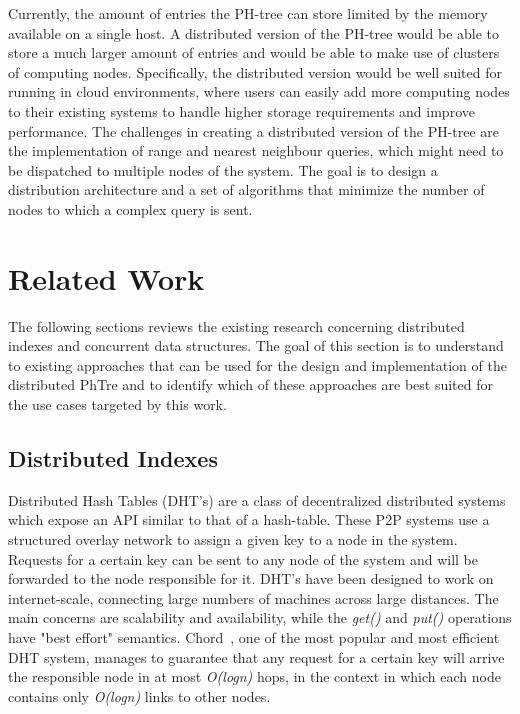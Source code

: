 \documentclass[11pt,a4paper]{globis-book}
\begin{document}
Currently, the amount of entries the PH-tree can store limited by the memory available on a single host. A distributed version of the PH-tree would be able to store a much larger amount of entries and would be able to make use of clusters of computing nodes. Specifically, the distributed version would be well suited for running in cloud environments, where users can easily add more computing nodes to their existing systems to handle higher storage requirements and improve performance. The challenges in creating a distributed version of the PH-tree are the implementation of range and nearest neighbour queries, which might need to be dispatched to multiple nodes of the system. The goal is to design a distribution architecture and a set of algorithms that minimize the number of nodes to which a complex query is sent.

\section{Related Work}
\label{sec:background-rw}

The following sections reviews the existing research concerning distributed indexes and concurrent data structures. The goal of this section is to understand to existing approaches that can be used for the design and implementation of the distributed PhTre and to identify which of these approaches are best suited for the use cases targeted by this work.
\subsection{Distributed Indexes}

Distributed Hash Tables (DHT's) are a class of decentralized distributed systems which expose an API similar to that of a hash-table. These P2P systems use a structured overlay network to assign a given key to a node in the system. Requests for a certain key can be sent to any node of the system and will be forwarded to the node responsible for it. DHT's have been designed to work on internet-scale, connecting large numbers of machines across large distances. The main concerns are scalability and availability, while the \textit{get()} and \textit{put()} operations have "best effort" semantics. Chord~\cite{Stoica2001chord}, one of the most popular and most efficient DHT system, manages to guarantee that any request for a certain key will arrive the responsible node in at most \textit{O(logn)} hops, in the context in which each node contains only \textit{O(logn)} links to other nodes. 
\end{document}
